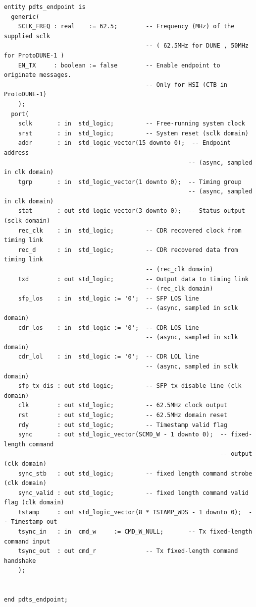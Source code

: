 \documentclass{dune}
\begin{document}
\begin{verbatim}
entity pdts_endpoint is
  generic(
    SCLK_FREQ : real    := 62.5;        -- Frequency (MHz) of the supplied sclk
                                        -- ( 62.5MHz for DUNE , 50MHz for ProtoDUNE-1 )
    EN_TX     : boolean := false        -- Enable endpoint to originate messages.
                                        -- Only for HSI (CTB in ProtoDUNE-1)
    );
  port(
    sclk       : in  std_logic;         -- Free-running system clock
    srst       : in  std_logic;         -- System reset (sclk domain)
    addr       : in  std_logic_vector(15 downto 0);  -- Endpoint address
                                                    -- (async, sampled in clk domain)
    tgrp       : in  std_logic_vector(1 downto 0);  -- Timing group
                                                    -- (async, sampled in clk domain)
    stat       : out std_logic_vector(3 downto 0);  -- Status output (sclk domain)
    rec_clk    : in  std_logic;         -- CDR recovered clock from timing link
    rec_d      : in  std_logic;         -- CDR recovered data from timing link
                                        -- (rec_clk domain)
    txd        : out std_logic;         -- Output data to timing link
                                        -- (rec_clk domain)
    sfp_los    : in  std_logic := '0';  -- SFP LOS line
                                        -- (async, sampled in sclk domain)
    cdr_los    : in  std_logic := '0';  -- CDR LOS line
                                        -- (async, sampled in sclk domain)
    cdr_lol    : in  std_logic := '0';  -- CDR LOL line
                                        -- (async, sampled in sclk domain)
    sfp_tx_dis : out std_logic;         -- SFP tx disable line (clk domain)
    clk        : out std_logic;         -- 62.5MHz clock output
    rst        : out std_logic;         -- 62.5MHz domain reset
    rdy        : out std_logic;         -- Timestamp valid flag
    sync       : out std_logic_vector(SCMD_W - 1 downto 0);  -- fixed-length command
                                                             -- output (clk domain)
    sync_stb   : out std_logic;         -- fixed length command strobe (clk domain)
    sync_valid : out std_logic;         -- fixed length command valid flag (clk domain)
    tstamp     : out std_logic_vector(8 * TSTAMP_WDS - 1 downto 0);  -- Timestamp out
    tsync_in   : in  cmd_w     := CMD_W_NULL;       -- Tx fixed-length command input
    tsync_out  : out cmd_r              -- Tx fixed-length command handshake
    );


end pdts_endpoint;
\end{verbatim}
\end{document}
